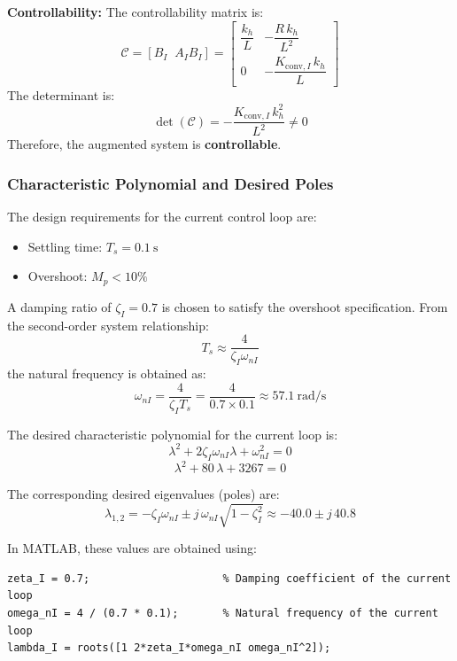 \documentclass{rapportCS}
\begin{document}
\noindent\textbf{Controllability:}
The controllability matrix is:
\[
\mathcal{C} = [B_I \;\; A_I B_I]
= 
\begin{bmatrix}
\dfrac{k_h}{L} & -\dfrac{R\,k_h}{L^2} \\[6pt]
0 & -\dfrac{K_{\mathrm{conv},I}\,k_h}{L}
\end{bmatrix}
\]
The determinant is:
\[
\det(\mathcal{C}) = -\frac{K_{\mathrm{conv},I}\,k_h^2}{L^2} \neq 0
\]
Therefore, the augmented system is \textbf{controllable}.



\subsubsection{Characteristic Polynomial and Desired Poles}

The design requirements for the current control loop are:
\begin{itemize}
    \item Settling time: $T_s = 0.1~\mathrm{s}$
    \item Overshoot: $M_p < 10\%$
\end{itemize}

A damping ratio of $\zeta_I = 0.7$ is chosen to satisfy the overshoot specification.  
From the second-order system relationship:
\begin{equation*}
T_s \approx \frac{4}{\zeta_I \omega_{nI}}
\end{equation*}
the natural frequency is obtained as:
\begin{equation*}
\omega_{nI} = \frac{4}{\zeta_I T_s} = \frac{4}{0.7 \times 0.1} \approx 57.1~\mathrm{rad/s}
\end{equation*}

The desired characteristic polynomial for the current loop is:
\begin{equation*}
\lambda^2 + 2\zeta_I \omega_{nI}\lambda + \omega_{nI}^2 = 0
\end{equation*}
\begin{equation*}
\lambda^2 + 80\,\lambda + 3267 = 0
\end{equation*}

The corresponding desired eigenvalues (poles) are:
\begin{equation*}
\lambda_{1,2} = -\zeta_I \omega_{nI} \pm j\,\omega_{nI}\sqrt{1-\zeta_I^2}
\approx -40.0 \pm j\,40.8
\end{equation*}

In MATLAB, these values are obtained using:
\begin{verbatim}
zeta_I = 0.7;                     % Damping coefficient of the current loop
omega_nI = 4 / (0.7 * 0.1);       % Natural frequency of the current loop
lambda_I = roots([1 2*zeta_I*omega_nI omega_nI^2]);
\end{verbatim}
\end{document}
